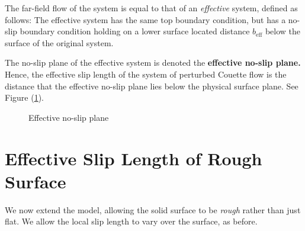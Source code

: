 \documentclass[12pt, a4paper, twoside, openright]{book}
\newcommand{\beff}{\ensuremath{b_{\mathrm{eff}}}}
\begin{document}
\vspace{1em}
The far-field flow of the system is equal to that of an \emph{effective} system, defined as follows:  The effective system has the same top boundary condition, but has a no-slip boundary condition holding on a lower surface located distance $\beff$ below the surface of the original system.

The no-slip plane of the effective system is denoted the \textbf{effective no-slip plane.}
Hence, the effective slip length of the system of perturbed Couette flow is the distance that the effective no-slip plane lies below the physical surface plane.  See Figure (\ref{effnoslip}).


\begin{figure}[ht!]
\centering
{}
\caption{Effective no-slip plane} \label{effnoslip} 
\end{figure}


\clearpage

\section{Effective Slip Length of Rough Surface}

We now extend the model, allowing the solid surface to be \emph{rough} rather than just flat. 
We allow the local slip length to vary over the surface, as before.

\end{document}
